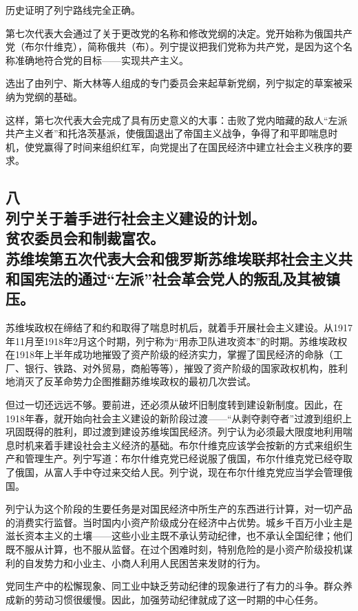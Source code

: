 历史证明了列宁路线完全正确。

第七次代表大会通过了关于更改党的名称和修改党纲的决定。党开始称为俄国共产党（布尔什维克），简称俄共（布）。列宁提议把我们党称为共产党，是因为这个名称准确地符合党的目标——实现共产主义。

选出了由列宁、斯大林等人组成的专门委员会来起草新党纲，列宁拟定的草案被采纳为党纲的基础。

这样，第七次代表大会完成了具有历史意义的大事：击败了党内暗藏的敌人“左派共产主义者”和托洛茨基派，使俄国退出了帝国主义战争，争得了和平即喘息时机，使党赢得了时间来组织红军，向党提出了在国民经济中建立社会主义秩序的要求。


\subsection[八\q 列宁关于着手进行社会主义建设的计划。贫农委员会和制裁富农。苏维埃第五次代表大会和俄罗斯苏维埃联邦社会主义共和国宪法的通过“左派”社会革会党人的叛乱及其被镇压。]{八\\列宁关于着手进行社会主义建设的计划。\\贫农委员会和制裁富农。\\苏维埃第五次代表大会和俄罗斯苏维埃联邦社会主义共和国宪法的通过“左派”社会革会党人的叛乱及其被镇压。}

苏维埃政权在缔结了和约和取得了喘息时机后，就着手开展社会主义建设。从1917年11月至1918年2月这个时期，列宁称为“用赤卫队进攻资本”的时期。苏维埃政权在1918年上半年成功地摧毁了资产阶级的经济实力，掌握了国民经济的命脉（工厂、银行、铁路、对外贸易，商船等等），摧毁了资产阶级的国家政权机构，胜利地消灭了反革命势力企图推翻苏维埃政权的最初几次尝试。

但过一切还远远不够。要前进，还必须从破坏旧制度转到建设新制度。因此，在1918年春，就开始向社会主义建设的新阶段过渡——“从剥夺剥夺者”过渡到组织上巩固既得的胜利，即过渡到建设苏维埃国民经济。列宁认为必须最大限度地利用喘息时机来着手建设社会主义经济的基础。布尔什维克应该学会按新的方式来组织生产和管理生产。列宁写道：布尔什维克党已经说服了俄国，布尔什维克党已经夺取了俄国，从富人手中夺过来交给人民。列宁说，现在布尔什维克党应当学会管理俄国。

列宁认为这个阶段的生要任务是对国民经济中所生产的东西进行计算，对一切产品的消费实行监督。当时国内小资产阶级成分在经济中占优势。城乡千百万小业主是滋长资本主义的土壤——这些小业主既不承认劳动纪律，也不承认全国纪律；他们既不服从计算，也不服从监督。在过个困难时刻，特别危险的是小资产阶级投机谋利的自发势力和小业主、小商人利用人民困苦来发财的行为。

党同生产中的松懈现象、同工业中缺乏劳动纪律的现象进行了有力的斗争。群众养成新的劳动习惯很缓慢。因此，加强劳动纪律就成了这一时期的中心任务。

